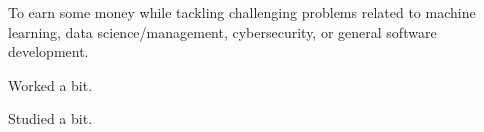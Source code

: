 \documentclass{resume}
\begin{document}

    \begin{fullwidth}
    \makeheader
    \end{fullwidth}

    To earn some money while tackling challenging problems related to machine learning, data science/management, cybersecurity, or general software development.

    Worked a bit.
    

    Studied a bit.
\end{document}

